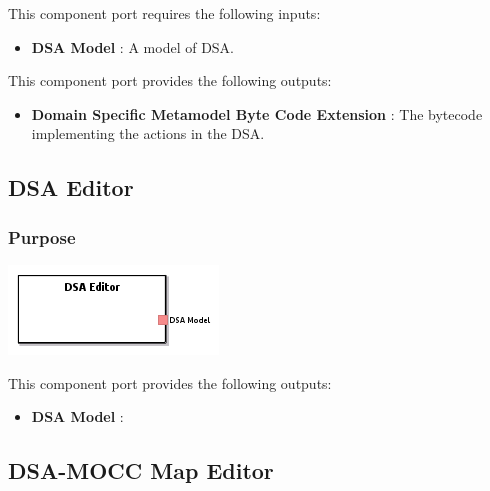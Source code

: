 \documentclass{gemoc} %
\begin{document}
This component port requires the following inputs:
\begin{itemize}
  \item \textbf{DSA Model} :
A model of DSA.
\end{itemize}

This component port provides the following outputs:
\begin{itemize}
  \item \textbf{Domain Specific Metamodel Byte Code Extension} :
The bytecode implementing the actions in the DSA.
\end{itemize}


\subsection{DSA Editor}


\subsubsection{Purpose}


\begin{center}
\includegraphics*[trim=0.0cm 0.0cm 0cm 0.0cm, clip=true]{../images/generated/Generated_DSA_Editor.png}
\end{center}


This component port provides the following outputs:
\begin{itemize}
  \item \textbf{DSA Model} :
\end{itemize}


\subsection{DSA-MOCC Map Editor}
\end{document}
